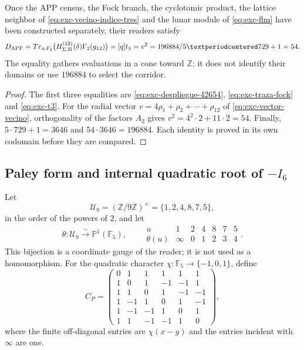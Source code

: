 \begin{theorem}
\label{thm:exc-cono-54}
Once the APP census, the Fock branch, the cyclotomic
product, the lattice neighbor of
\cref{eq:exc-vecino-indice-tres} and the lunar module of
\cref{eq:exc-flm} have been constructed separately, their readers satisfy
\begin{equation}
 D_{\rm APP}
 =\operatorname{Tr}_{o,\mathcal F_2}
  \bigl(\mathcal H_{\Sigma,\Pi}^{(12)}(\delta)\Gamma_2(g_{12})\bigr)
 =[q]t_3=v^2=\frac{196884}{5\cdot729+1}=54.
 \label{eq:exc-cono-54}
\end{equation}
The equality gathers evaluations in a cone toward \(\mathbb Z\); it does not
identify their domains or use \(196884\) to select the corridor.
\end{theorem}

\begin{proof}
The first three equalities are
\eqref{eq:exc-despliegue-42654}, \eqref{eq:exc-traza-fock} and
\eqref{eq:exc-t3}. For the radial vector
\(v=4\rho_1+\rho_2+\cdots+\rho_{12}\) of
\eqref{eq:exc-vector-vecino}, orthogonality of the factors \(A_2\) gives
\(v^2=4^2\cdot2+11\cdot2=54\). Finally,
\(5\cdot729+1=3646\) and \(54\cdot3646=196884\). Each identity is proved in
its own codomain before they are compared.
\end{proof}

\subsection{\texorpdfstring{Paley form and internal quadratic root of \(-I_6\)}{Paley form and internal quadratic root of -I6}}

Let
\[
 \mathcal U_9=(\mathbb Z/9\mathbb Z)^\times=\{1,2,4,8,7,5\},
\]
in the order of the powers of \(2\), and let
\begin{equation}
 \theta:\mathcal U_9\xrightarrow{\sim}\mathbb P^1(\mathbb F_5),
 \qquad
 \begin{array}{c|cccccc}
 u&1&2&4&8&7&5\\ \hline
 \theta(u)&\infty&0&1&2&3&4
 \end{array}.
 \label{eq:exc-calibre-proyectivo}
\end{equation}
This bijection is a coordinate gauge of the reader; it is not used as a
homomorphism. For the quadratic character
\(\chi:\mathbb F_5\to\{-1,0,1\}\), define
\begin{equation}
 C_P=
 \begin{pmatrix}
 0& 1& 1& 1& 1& 1\\
 1& 0& 1&-1&-1& 1\\
 1& 1& 0& 1&-1&-1\\
 1&-1& 1& 0& 1&-1\\
 1&-1&-1& 1& 0& 1\\
 1& 1&-1&-1& 1& 0
 \end{pmatrix},
 \label{eq:exc-matriz-paley}
\end{equation}
where the finite off-diagonal entries are \(\chi(x-y)\) and the
entries incident with \(\infty\) are one.

